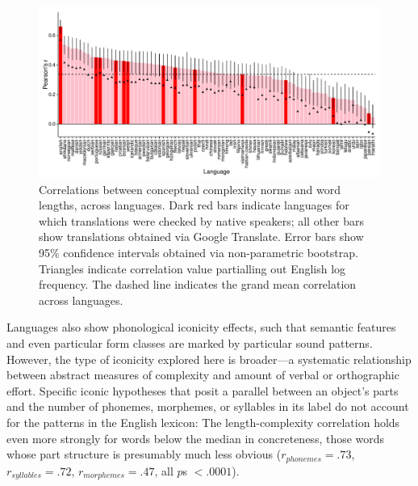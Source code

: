 \documentclass[12pt]{article}
\begin{document}

\begin{figure}[t!]
\begin{center}
\includegraphics[scale = .53]{figs/FIG_3.pdf}
\caption{Correlations between conceptual complexity norms and word lengths, across languages. Dark red bars indicate languages for which translations were checked by native speakers; all other bars show translations obtained via Google Translate. Error bars show 95\% confidence intervals obtained via non-parametric bootstrap. Triangles indicate correlation value partialling out English log frequency. The dashed line indicates the grand mean correlation across languages.} 
\end{center}
\label{fig:real_objs}
\end{figure}
				

Languages also show phonological iconicity effects, such that semantic features \cite{maurer2006shape} and even particular form classes \cite{farmer2006phonological} are marked by particular sound patterns. However, the type of iconicity explored here is broader---a systematic relationship between abstract measures of complexity and amount of verbal or orthographic effort. Specific iconic hypotheses that posit a parallel between an object's parts and the number of phonemes, morphemes, or syllables in its label do not account for the patterns in the English lexicon: The length-complexity correlation holds even more strongly for words below the median in concreteness, those words whose part structure is presumably much less obvious ($r_{phonemes}= .73$, $r_{syllables} = .72$, $r_{morphemes} = .47$, all $p$s $< .0001$). 
\end{document}
